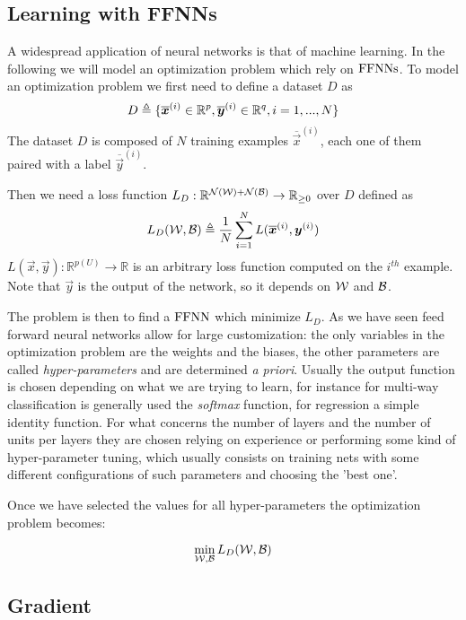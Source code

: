 \subsection{Learning with FFNNs}
A widespread application of neural networks is that of machine learning. In the following we will model an optimization problem which rely on $\mathrm{FFNNs}$.
To model an optimization problem we first need to define a dataset $D$ as 
\begin{equation}
D\triangleq\{\overline{\boldsymbol{x}}^{(i)} \in \mathbb{R}^p, \overline{\boldsymbol{y}}^{(i)} \in \mathbb{R}^q,  i=1,...,N\}
\end{equation}
The dataset $D$ is composed of $N$ training examples $\overline{\vec{x}}^{(i)}$, each one of them paired with a label $\overline{\vec{y}}^{(i)}$.

Then we need a loss function $L_D:\mathbb{R}^{\mathcal{N}(\mathcal{W})+\mathcal{N}(\mathcal{B})} \rightarrow \mathbb{R}_{\geq 0}$ over $D$ defined as
\begin{equation}
L_D(\mathcal{W},\mathcal{B})\triangleq\frac{1}{N}\sum_{i=1}^N L(\overline{\boldsymbol{x}}^{(i)},\boldsymbol{y}^{(i)}) 
\end{equation}
$L(\vec{x},\vec{y}):\mathbb{R}^{p(U)} \rightarrow \mathbb{R}$ is an arbitrary loss function computed on the $i^{th}$ example. Note that $\vec{y}$ is the output of the
network, so it depends on $\mathcal{W}$ and $\mathcal{B}$.


The problem is then to find a $\mathrm{FFNN}$ which minimize $L_D$. As we have seen feed forward neural networks allow for large customization: the only variables in the optimization problem are the weights
and the biases, the other
parameters are called \textit{hyper-parameters} and are determined \textit{a priori}. Usually the output function is chosen depending on what we are trying to learn, for instance for multi-way classification
is generally used the \textit{softmax} function, for regression a simple identity function.
For what concerns the number of layers and the number of units per layers they are chosen relying on experience or performing some kind of hyper-parameter tuning, which usually consists on training nets
with some different configurations of such parameters and choosing the 'best one'.

Once we have selected the values for all hyper-parameters the optimization problem becomes:

\begin{equation}
\min_{\mathcal{W},\mathcal{B}} L_D(\mathcal{W},\mathcal{B}) \\
\end{equation}


\subsection{Gradient}



